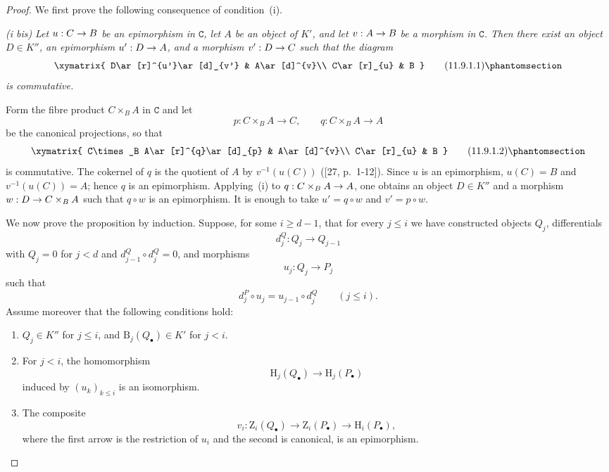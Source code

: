 \documentclass[oneside]{amsart}
\theoremstyle{ega-env-style}
\theoremstyle{ega-thm-env-style}
\theoremstyle{ega-defn-env-style}
\def\cat{\mathtt}                   %
\def\leq{\leqslant}                 %
\def\geq{\geqslant}                 %
\def\HH{\mathrm{H}}                 %
\renewcommand{\to}{\mathchoice{\longrightarrow}{\rightarrow}{\rightarrow}{\rightarrow}}
\newcommand{\oldpage}[2][]{{\marginnote{\normalfont{\textbf{#1}~|~#2}}}\ignorespaces}
\let\EGAOriginalLabel\label
\renewcommand{\label}[1]{\phantomsection\EGAOriginalLabel{#1}}
\begin{document}
\begin{proof}
We first prove the following consequence of condition~(i).

\medskip\noindent
\emph{(i bis)}
\emph{Let $u:C\to B$ be an epimorphism in $\cat{C}$, let $A$ be an
object of $K'$, and let $v:A\to B$ be a morphism in $\cat{C}$.
Then there exist an object $D\in K''$, an epimorphism $u':D\to A$, and a
morphism $v':D\to C$ such that the diagram}
\[
  \xymatrix{
    D\ar[r]^{u'}\ar[d]_{v'} & A\ar[d]^{v}\\
    C\ar[r]_{u} & B
  }
  \tag{11.9.1.1}\label{0.11.9.1.1}
\]
\emph{is commutative.}

Form the fibre product $C\times_B A$ in $\cat{C}$ and let
\[
  p:C\times_B A\longrightarrow C,
  \qquad
  q:C\times_B A\longrightarrow A
\]
be the canonical projections, so that
\oldpage[0\textsubscript{III}]{47}
\[
  \xymatrix{
    C\times_B A\ar[r]^{q}\ar[d]_{p} & A\ar[d]^{v}\\
    C\ar[r]_{u} & B
  }
  \tag{11.9.1.2}\label{0.11.9.1.2}
\]
is commutative.
The cokernel of $q$ is the quotient of $A$ by $v^{-1}(u(C))$
([27, p.~1-12]).
Since $u$ is an epimorphism, $u(C)=B$ and
$v^{-1}(u(C))=A$; hence $q$ is an epimorphism.
Applying~(i) to $q:C\times_B A\to A$, one obtains an object
$D\in K''$ and a morphism $w:D\to C\times_B A$ such that $q\circ w$ is
an epimorphism.
It is enough to take $u'=q\circ w$ and $v'=p\circ w$.

\medskip
We now prove the proposition by induction.
Suppose, for some $i\geq d-1$, that for every $j\leq i$ we have
constructed objects $Q_j$, differentials
\[
  d^Q_j:Q_j\longrightarrow Q_{j-1}
\]
with $Q_j=0$ for $j<d$ and
$d^Q_{j-1}\circ d^Q_j=0$, and morphisms
\[
  u_j:Q_j\longrightarrow P_j
\]
such that
\[
  d^P_j\circ u_j=u_{j-1}\circ d^Q_j
  \qquad(j\leq i).
\]
Assume moreover that the following conditions hold:
\begin{enumerate}
  \item[$(\mathrm{I}_i)$]
  $Q_j\in K''$ for $j\leq i$, and
  $\mathrm{B}_j(Q_\bullet)\in K'$ for $j<i$.

  \item[$(\mathrm{II}_i)$]
  For $j<i$, the homomorphism
  \[
    \HH_j(Q_\bullet)\longrightarrow\HH_j(P_\bullet)
  \]
  induced by $(u_k)_{k\leq i}$ is an isomorphism.

  \item[$(\mathrm{III}_i)$]
  The composite
  \[
    v_i:
    \mathrm{Z}_i(Q_\bullet)
    \longrightarrow
    \mathrm{Z}_i(P_\bullet)
    \longrightarrow
    \HH_i(P_\bullet),
  \]
  where the first arrow is the restriction of $u_i$ and the second is
  canonical, is an epimorphism.
\end{enumerate}


\end{proof}
\end{document}
